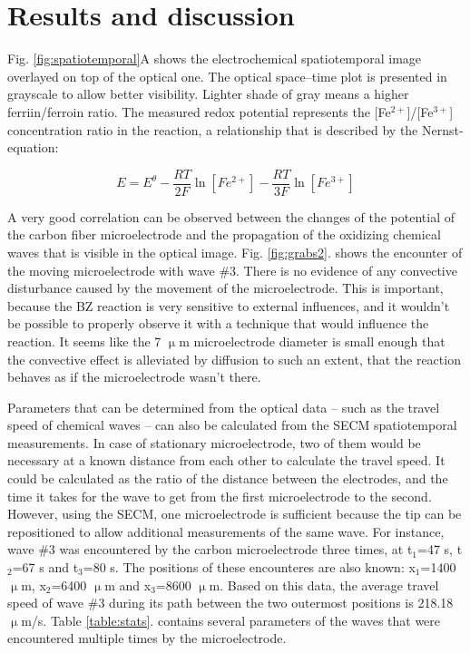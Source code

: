 \documentclass[3p, twocolumn]{elsarticle}
\begin{document}
\section{Results and discussion}

Fig. \ref{fig:spatiotemporal}A shows the electrochemical spatiotemporal image overlayed on top of the optical one.
The optical space--time plot is presented in grayscale to allow better visibility.
Lighter shade of gray means a higher ferriin/ferroin  ratio.
The measured redox potential represents the [Fe$^{2+}$]/[Fe$^{3+}$]  concentration ratio in the reaction, a relationship that is described by the Nernst-equation:

\begin{equation}
E = E^\theta - \frac{RT}{2F}\ln [Fe^{2+}] -  \frac{RT}{3F}\ln [Fe^{3+}]
\end{equation}

A very good correlation can be observed between the changes of the potential of the carbon fiber microelectrode and the propagation of the oxidizing chemical waves that is visible in the optical image.
Fig. \ref{fig:grabs2}. shows the encounter of the moving microelectrode with wave \#3.
There is no evidence of any convective disturbance caused by the movement of the microelectrode.
This is important, because the BZ reaction is very sensitive to external influences, and it wouldn't be possible to properly observe it with a technique that would influence the reaction.
It seems like the 7 $\upmu$m microelectrode diameter is small enough that the convective effect is alleviated by diffusion to such an extent, that the reaction behaves as if the microelectrode wasn't there.

Parameters that can be determined from the optical data -- such as the travel speed of chemical waves -- can also be calculated from the SECM spatiotemporal measurements.
In case of stationary microelectrode, two of them would be necessary at a known distance from each other to calculate the travel speed.
It could be calculated as the ratio of the distance between the electrodes, and the time it takes for the wave to get from the first microelectrode to the second.
However, using the SECM, one microelectrode is sufficient because the tip can be repositioned to allow additional measurements of the same wave.
For instance, wave \#3 was encountered by the carbon microelectrode three times, at t$_1$=47 s, t$_2$=67 s and t$_3$=80 s.
The positions of these encounteres are also known: x$_1$=1400 $\upmu$m, x$_2$=6400 $\upmu$m and x$_3$=8600 $\upmu$m.
Based on this data, the average travel speed of wave \#3 during its path between the two outermost positions is 218.18 $\upmu$m/s.
Table \ref{table:stats}. contains several parameters of the waves that were encountered multiple times by the microelectrode. 
\end{document}
